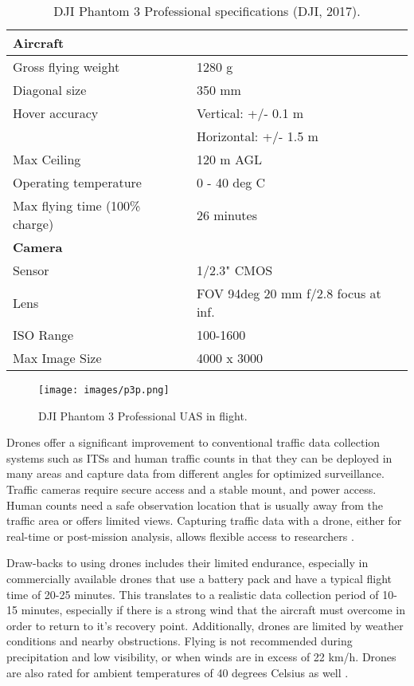 \begin{table}[H]
\centering
\caption[DJI Phantom 3 Professional specifications]{DJI Phantom 3 Professional specifications (DJI, 2017).}
\label{tb:p3p-specs}
\begin{tabular}{@{}ll@{}}
\hline
\textbf{Aircraft} &  \\ \hline
Gross flying weight & 1280 g \\
Diagonal size & 350 mm \\
Hover accuracy & Vertical: +/- 0.1 m \\
 & Horizontal: +/- 1.5 m \\
Max Ceiling & 120 m AGL \\
Operating temperature & 0 - 40 deg C \\
Max flying time (100\% charge) & 26 minutes \\ \hline
\textbf{Camera} &  \\ \hline
Sensor & 1/2.3" CMOS \\
Lens & FOV 94deg 20 mm f/2.8 focus at inf. \\
ISO Range & 100-1600 \\
Max Image Size & 4000 x 3000 \\ \hline
\end{tabular}
\end{table}

%
\begin{figure}[H]
\centering
\texttt{[image: images/p3p.png]}  %
\caption{DJI Phantom 3 Professional UAS in flight.}
\label{fig:p3p}
\end{figure}
%
Drones offer a significant improvement to conventional traffic data collection systems such as ITSs and human traffic counts in that they can be deployed in many areas and capture data from different angles for optimized surveillance. Traffic cameras require secure access and a stable mount, and power access. Human counts need a safe observation location that is usually away from the traffic area or offers limited views. Capturing traffic data with a drone, either for real-time or post-mission analysis, allows flexible access to researchers \citep{Westoby2012}. 

Draw-backs to using drones includes their limited endurance, especially in commercially available drones that use a battery pack and have a typical flight time of 20-25 minutes. This translates to a realistic data collection period of 10-15 minutes, especially if there is a strong wind that the aircraft must overcome in order to return to it's recovery point. Additionally, drones are limited by weather conditions and nearby obstructions. Flying is not recommended during precipitation and low visibility, or when winds are in excess of 22 km/h. Drones are also rated for ambient temperatures of 40 degrees Celsius as well \citep{DJI2017}.

